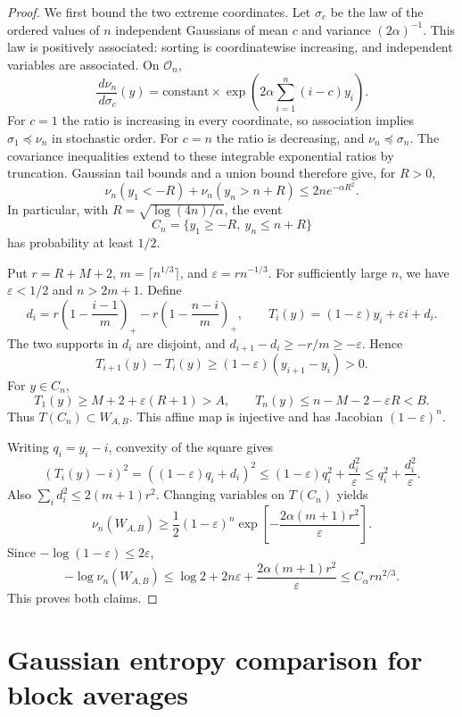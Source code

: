 \documentclass[11pt,reqno]{amsart}
\theoremstyle{definition}
\theoremstyle{remark}
\newcommand{\1}{\mathbf 1}
\newcommand{\dd}{\,d}
\numberwithin{equation}{section}
\begin{document}
\begin{proof}
We first bound the two extreme coordinates. Let $\sigma_c$ be the law
of the ordered values of $n$ independent Gaussians of mean $c$ and
variance $(2\alpha)^{-1}$. This law is positively associated: sorting is
coordinatewise increasing, and independent variables are associated.
On $\mathcal O_n$,
\[
 \frac{\dd\nu_n}{\dd\sigma_c}(y)
 =\text{constant}\times
 \exp\left(2\alpha\sum_{i=1}^n(i-c)y_i\right).
\]
For $c=1$ the ratio is increasing in every coordinate, so association
implies $\sigma_1\preceq\nu_n$ in stochastic order. For $c=n$ the ratio
is decreasing, and $\nu_n\preceq\sigma_n$. The covariance inequalities
extend to these integrable exponential ratios by truncation. Gaussian
tail bounds and a union bound therefore give, for $R>0$,
\begin{equation}\label{eq:extreme}
 \nu_n(y_1<-R)+\nu_n(y_n>n+R)
 \le 2n e^{-\alpha R^2}.
\end{equation}
In particular, with $R=\sqrt{\log(4n)/\alpha}$, the event
\[
 C_n=\{y_1\ge -R,\ y_n\le n+R\}
\]
has probability at least $1/2$.

Put $r=R+M+2$, $m=\lceil n^{1/3}\rceil$, and
$\varepsilon=rn^{-1/3}$. For sufficiently large $n$, we have
$\varepsilon<1/2$ and $n>2m+1$. Define
\[
 d_i=r\left(1-\frac{i-1}{m}\right)_+
     -r\left(1-\frac{n-i}{m}\right)_+,
 \qquad
 T_i(y)=(1-\varepsilon)y_i+\varepsilon i+d_i.
\]
The two supports in $d_i$ are disjoint, and
$d_{i+1}-d_i\ge-r/m\ge-\varepsilon$. Hence
\[
 T_{i+1}(y)-T_i(y)
 \ge(1-\varepsilon)(y_{i+1}-y_i)>0.
\]
For $y\in C_n$,
\[
 T_1(y)\ge M+2+\varepsilon(R+1)>A,
 \qquad
 T_n(y)\le n-M-2-\varepsilon R<B.
\]
Thus $T(C_n)\subset W_{A,B}$. This affine map is injective and has
Jacobian $(1-\varepsilon)^n$.

Writing $q_i=y_i-i$, convexity of the square gives
\[
 (T_i(y)-i)^2=((1-\varepsilon)q_i+d_i)^2
 \le(1-\varepsilon)q_i^2+\frac{d_i^2}{\varepsilon}
 \le q_i^2+\frac{d_i^2}{\varepsilon}.
\]
Also $\sum_i d_i^2\le2(m+1)r^2$. Changing variables on $T(C_n)$ yields
\[
 \nu_n(W_{A,B})
 \ge\frac12(1-\varepsilon)^n
 \exp\left[-\frac{2\alpha(m+1)r^2}{\varepsilon}\right].
\]
Since $-\log(1-\varepsilon)\le2\varepsilon$,
\[
 -\log\nu_n(W_{A,B})
 \le\log2+2n\varepsilon+
       \frac{2\alpha(m+1)r^2}{\varepsilon}
 \le C_\alpha r n^{2/3}.
\]
This proves both claims.
\end{proof}

\section{Gaussian entropy comparison for block averages}\label{sec:comparison}
\end{document}
